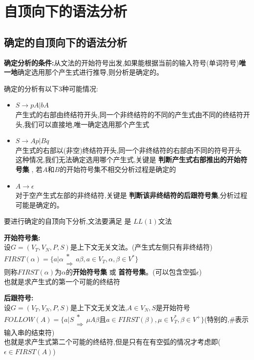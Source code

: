 \documentclass[UTF8,a4paper]{ctexart}
\newcommand{\spaceline}{\vspace{\baselineskip}}
\begin{document}
\section{自顶向下的语法分析}
\subsection{确定的自顶向下的语法分析}

\textbf{确定分析的条件:}从文法的开始符号出发,如果能根据当前的输入符号(单词符号)\textbf{唯一地}确定选用那个产生式进行推导,则分析是确定的。

确定的分析有以下3种可能情况:
\begin{itemize}
 \item $S\to pA|bA$\\
       产生式的右部由终结符开头,同一个非终结符的不同的产生式由不同的终结符开头,我们可以直接地,唯一确定选用那个产生式
 \item $S\to Ap|Bq$\\
       产生式的右部以(非空)终结符开头,同一个非终结符的右部由不同的符号开头\\
       这种情况,我们无法确定选用哪个产生式,关键是 \textbf{判断产生式右部推出的开始符号集} , 若$A$和$B$的开始符号集不相交分析过程是确定的
 \item $A \to \epsilon$\\
       对于空产生式左部的非终结符,关键是 \textbf{判断该非终结符的后跟符号集},分析过程可能是确定的。
\end{itemize}

要进行确定的自顶向下分析,文法要满足 是 $LL(1)$文法

\textbf{开始符号集:}\\
设$G = (V_T , V_N , P , S)$是上下文无关文法。(产生式左侧只有非终结符)\\
$\renewcommand{\arraystretch}{0.5}
 FIRST(\alpha) = \{a | \alpha \begin{array}{c} * \\ \Rightarrow \end{array}  a \beta , a \in V_T , \alpha ,\beta\in V^*\}$\\
则称$\renewcommand{\arraystretch}{0.5}
 FIRST(\alpha)$为$\alpha$的\textbf{开始符号集} 或 \textbf{首符号集}。(可以包含空弧$\epsilon$)\\
{\color{blue} 也就是求产生式的第一个可能的终结符}

\spaceline
\textbf{后跟符号:}\\
设$G = (V_T , V_N , P , S)$是上下文无关文法,$A\in V_N , S$是开始符号\\
$\renewcommand{\arraystretch}{0.5}FOLLOW(A) = \{ a | S \begin{array}{c} * \\ \Rightarrow \end{array}
 \mu A\beta\text{且}a\in FIRST(\beta) ,\mu\in V^*_T , \beta\in V^+ \}$(特别的,\#表示输入串的结束符)\\
{\color{blue} 也就是求产生式第二个可能的终结符,但是只有在有空弧的情况才考虑即($\epsilon \in FIRST(A)$)}
\end{document}

